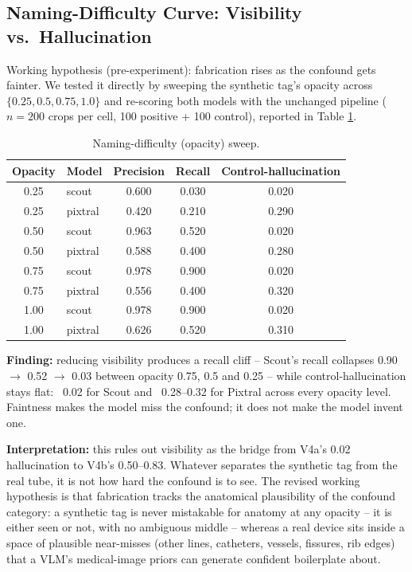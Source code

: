 \documentclass{ieeeaccess}
\begin{document}
\subsection{Naming-Difficulty Curve: Visibility vs.\ Hallucination}
Working hypothesis (pre-experiment): fabrication rises as the confound gets
fainter. We tested it directly by sweeping the synthetic tag's opacity
across $\{0.25, 0.5, 0.75, 1.0\}$ and re-scoring both models with the
unchanged pipeline ($n = 200$ crops per cell, 100 positive + 100 control),
reported in Table \ref{tab:opacity}.

\begin{table}[h]
\caption{Naming-difficulty (opacity) sweep.}
\label{tab:opacity}
\centering
\small
\begin{tabular}{|c|l|c|c|c|}
\hline
Opacity & Model & Precision & Recall & Control-hallucination \\
\hline
0.25 & scout & 0.600 & 0.030 & 0.020 \\
0.25 & pixtral & 0.420 & 0.210 & 0.290 \\
0.50 & scout & 0.963 & 0.520 & 0.020 \\
0.50 & pixtral & 0.588 & 0.400 & 0.280 \\
0.75 & scout & 0.978 & 0.900 & 0.020 \\
0.75 & pixtral & 0.556 & 0.400 & 0.320 \\
1.00 & scout & 0.978 & 0.900 & 0.020 \\
1.00 & pixtral & 0.626 & 0.520 & 0.310 \\
\hline
\end{tabular}
\end{table}

\textbf{Finding:} reducing visibility produces a recall cliff -- Scout's
recall collapses 0.90 $\to$ 0.52 $\to$ 0.03 between opacity 0.75, 0.5 and
0.25 -- while control-hallucination stays flat: ~0.02 for Scout and
~0.28--0.32 for Pixtral across every opacity level. Faintness makes the model
miss the confound; it does not make the model invent one.

\textbf{Interpretation:} this rules out visibility as the bridge from V4a's
0.02 hallucination to V4b's 0.50--0.83. Whatever separates the synthetic tag
from the real tube, it is not how hard the confound is to see. The revised
working hypothesis is that fabrication tracks the anatomical plausibility of
the confound category: a synthetic tag is never mistakable for anatomy at
any opacity -- it is either seen or not, with no ambiguous middle -- whereas a
real device sits inside a space of plausible near-misses (other lines,
catheters, vessels, fissures, rib edges) that a VLM's medical-image priors
can generate confident boilerplate about.
\end{document}
